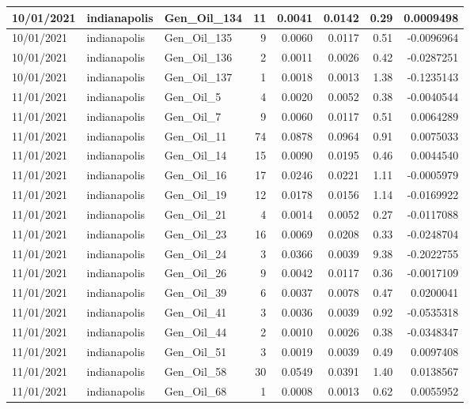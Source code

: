 \documentclass[
  letterpaper,
  DIV=11,
  numbers=noendperiod]{scrartcl}
\begin{document}
\begin{tabular}{l|l|l|r|r|r|r|r}
\hline
10/01/2021 & indianapolis & Gen\_Oil\_134 & 11 & 0.0041 & 0.0142 & 0.29 & 0.0009498\\
\hline
10/01/2021 & indianapolis & Gen\_Oil\_135 & 9 & 0.0060 & 0.0117 & 0.51 & -0.0096964\\
\hline
10/01/2021 & indianapolis & Gen\_Oil\_136 & 2 & 0.0011 & 0.0026 & 0.42 & -0.0287251\\
\hline
10/01/2021 & indianapolis & Gen\_Oil\_137 & 1 & 0.0018 & 0.0013 & 1.38 & -0.1235143\\
\hline
11/01/2021 & indianapolis & Gen\_Oil\_5 & 4 & 0.0020 & 0.0052 & 0.38 & -0.0040544\\
\hline
11/01/2021 & indianapolis & Gen\_Oil\_7 & 9 & 0.0060 & 0.0117 & 0.51 & 0.0064289\\
\hline
11/01/2021 & indianapolis & Gen\_Oil\_11 & 74 & 0.0878 & 0.0964 & 0.91 & 0.0075033\\
\hline
11/01/2021 & indianapolis & Gen\_Oil\_14 & 15 & 0.0090 & 0.0195 & 0.46 & 0.0044540\\
\hline
11/01/2021 & indianapolis & Gen\_Oil\_16 & 17 & 0.0246 & 0.0221 & 1.11 & -0.0005979\\
\hline
11/01/2021 & indianapolis & Gen\_Oil\_19 & 12 & 0.0178 & 0.0156 & 1.14 & -0.0169922\\
\hline
11/01/2021 & indianapolis & Gen\_Oil\_21 & 4 & 0.0014 & 0.0052 & 0.27 & -0.0117088\\
\hline
11/01/2021 & indianapolis & Gen\_Oil\_23 & 16 & 0.0069 & 0.0208 & 0.33 & -0.0248704\\
\hline
11/01/2021 & indianapolis & Gen\_Oil\_24 & 3 & 0.0366 & 0.0039 & 9.38 & -0.2022755\\
\hline
11/01/2021 & indianapolis & Gen\_Oil\_26 & 9 & 0.0042 & 0.0117 & 0.36 & -0.0017109\\
\hline
11/01/2021 & indianapolis & Gen\_Oil\_39 & 6 & 0.0037 & 0.0078 & 0.47 & 0.0200041\\
\hline
11/01/2021 & indianapolis & Gen\_Oil\_41 & 3 & 0.0036 & 0.0039 & 0.92 & -0.0535318\\
\hline
11/01/2021 & indianapolis & Gen\_Oil\_44 & 2 & 0.0010 & 0.0026 & 0.38 & -0.0348347\\
\hline
11/01/2021 & indianapolis & Gen\_Oil\_51 & 3 & 0.0019 & 0.0039 & 0.49 & 0.0097408\\
\hline
11/01/2021 & indianapolis & Gen\_Oil\_58 & 30 & 0.0549 & 0.0391 & 1.40 & 0.0138567\\
\hline
11/01/2021 & indianapolis & Gen\_Oil\_68 & 1 & 0.0008 & 0.0013 & 0.62 & 0.0055952\\

\end{tabular}
\end{document}
